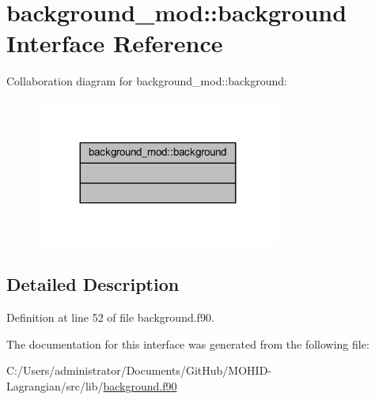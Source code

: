 \hypertarget{interfacebackground__mod_1_1background}{}\section{background\+\_\+mod\+:\+:background Interface Reference}
\label{interfacebackground__mod_1_1background}


Collaboration diagram for background\+\_\+mod\+:\+:background\+:\nopagebreak
\begin{figure}[H]
\begin{center}
\leavevmode
\includegraphics[width=227pt]{interfacebackground__mod_1_1background__coll__graph}
\end{center}
\end{figure}


\subsection{Detailed Description}


Definition at line 52 of file background.\+f90.



The documentation for this interface was generated from the following file\+:\begin{DoxyCompactItemize}
\item 
C\+:/\+Users/administrator/\+Documents/\+Git\+Hub/\+M\+O\+H\+I\+D-\/\+Lagrangian/src/lib/\mbox{\hyperlink{background_8f90}{background.\+f90}}\end{DoxyCompactItemize}
